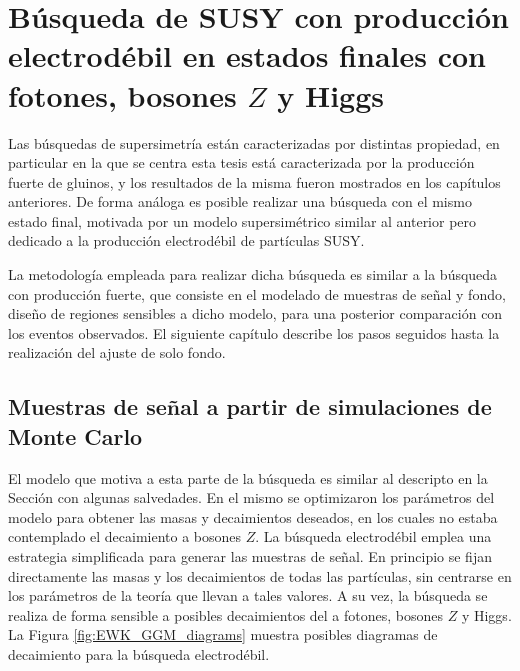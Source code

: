 \chapter{Búsqueda de SUSY con producción electrodébil en estados finales con fotones, bosones $Z$ y Higgs}\label{cap:analysis_EWK}

Las búsquedas de supersimetría están caracterizadas por distintas propiedad, en particular en la que se centra esta tesis está caracterizada por la producción fuerte de gluinos, y los resultados de la misma fueron mostrados en los capítulos anteriores. De forma análoga es posible realizar una búsqueda con el mismo estado final, motivada por un modelo supersimétrico similar al anterior pero dedicado a la producción electrodébil de partículas SUSY.

La metodología empleada para realizar dicha búsqueda es similar a la búsqueda con producción fuerte, que consiste en el modelado de muestras de señal y fondo, diseño de regiones sensibles a dicho modelo, para una posterior comparación con los eventos observados. El siguiente capítulo describe los pasos seguidos hasta la realización del ajuste de solo fondo.


\section{Muestras de señal a partir de simulaciones de Monte Carlo}

El modelo que motiva a esta parte de la búsqueda es similar al descripto en la Sección \label{sec:signal_samples} con algunas salvedades. En el mismo se optimizaron los parámetros del modelo para obtener las masas y decaimientos deseados, en los cuales no estaba contemplado el decaimiento a bosones $Z$. La búsqueda electrodébil emplea una estrategia simplificada para generar las muestras de señal. En principio se fijan directamente las masas y los decaimientos de todas las partículas, sin centrarse en los parámetros de la teoría que llevan a tales valores. A su vez, la búsqueda se realiza de forma sensible a posibles decaimientos del \ninoone a fotones, bosones $Z$ y Higgs. La Figura \ref{fig:EWK_GGM_diagrams} muestra posibles diagramas de decaimiento para la búsqueda electrodébil.


